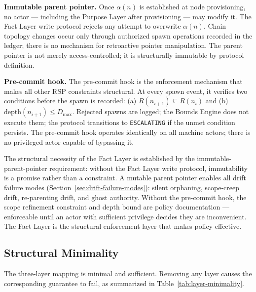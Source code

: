 \medskip
\noindent\textbf{Immutable parent pointer.} Once $\alpha(n)$ is established at node provisioning, no actor --- including the Purpose Layer after provisioning --- may modify it. The Fact Layer write protocol rejects any attempt to overwrite $\alpha(n)$. Chain topology changes occur only through authorized spawn operations recorded in the ledger; there is no mechanism for retroactive pointer manipulation. The parent pointer is not merely access-controlled; it is structurally immutable by protocol definition.

\medskip
\noindent\textbf{Pre-commit hook.} The pre-commit hook is the enforcement mechanism that makes all other RSP constraints structural. At every spawn event, it verifies two conditions before the spawn is recorded: (a) $R(n_{i+1}) \subseteq R(n_i)$ and (b) $\mathrm{depth}(n_{i+1}) \leq D_{\mathrm{max}}$. Rejected spawns are logged; the Bounds Engine does not execute them; the protocol transitions to \texttt{ESCALATING} if the unmet condition persists. The pre-commit hook operates identically on all machine actors; there is no privileged actor capable of bypassing it.

The structural necessity of the Fact Layer is established by the immutable-parent-pointer requirement: without the Fact Layer write protocol, immutability is a promise rather than a constraint. A mutable parent pointer enables all drift failure modes (Section~\ref{sec:drift-failure-modes}): silent orphaning, scope-creep drift, re-parenting drift, and ghost authority. Without the pre-commit hook, the scope refinement constraint and depth bound are policy documentation --- enforceable until an actor with sufficient privilege decides they are inconvenient. The Fact Layer is the structural enforcement layer that makes policy effective.

\subsection{Structural Minimality}
\label{sec:rs-minimality}

The three-layer mapping is minimal and sufficient. Removing any layer causes the corresponding guarantee to fail, as summarized in Table~\ref{tab:layer-minimality}.

